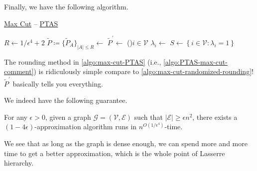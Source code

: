 Finally, we have the following algorithm.

\begin{algorithm}[H]\label{algo:max-cut-PTAS}
	\DontPrintSemicolon{}
	\caption{\hyperref[prb:max-cut]{Max Cut} -- \href{https://en.wikipedia.org/wiki/Polynomial-time_approximation_scheme}{PTAS}}
	\BlankLine
	\(R\gets 1 / \epsilon ^4 + 2\)\;
	\(\widetilde{P} \coloneqq \{ \widetilde{P} _A \}_{\left\vert A \right\vert \leq R} \gets\)\;
	\(\widetilde{P} ^\prime \gets\)
	\;
	\label{algo:PTAS-max-cut-comment}
	\For(){\(i\in \mathcal{V} \)}{
		\(\lambda _i\gets\)\;
	}
	\(S\gets \left\{ i\in \mathcal{V} \colon \lambda _i = 1 \right\} \)\;
	\;
\end{algorithm}

\begin{remark}
	The rounding method in \autoref{algo:max-cut-PTAS} (i.e., \autoref{algo:PTAS-max-cut-comment}) is ridiculously simple compare to \autoref{algo:max-cut-randomized-rounding}! \(\widetilde{P} ^\prime \) basically tells you everything.
\end{remark}

We indeed have the following guarantee.

\begin{theorem}\label{thm:PTAS-for-max-cut}
	For any \(\epsilon >0\), given a graph \(\mathcal{G} =(\mathcal{V} , \mathcal{E} )\) such that \(\left\vert \mathcal{E}  \right\vert \geq \epsilon n^{2} \), there exists a \((1 - 4\epsilon )\)-approximation algorithm runs in \(n^{O(1 / \epsilon ^4)}\)-time.
\end{theorem}

We see that as long as the graph is dense enough, we can spend more and more time to get a better approximation, which is the whole point of Lasserre hierarchy.